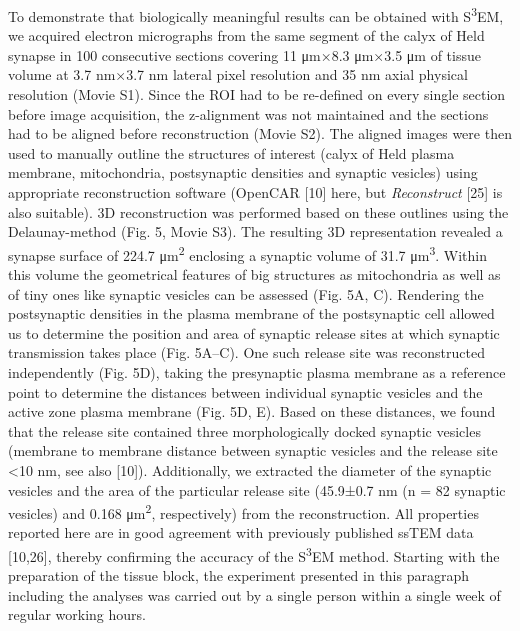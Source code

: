 \documentclass{article}
\begin{document}
To demonstrate that biologically meaningful results can be obtained with S\textsuperscript{3}EM, we acquired electron micrographs from the same segment of the calyx of Held synapse in 100 consecutive sections covering 11 μm×8.3 μm×3.5 μm of tissue volume at 3.7 nm×3.7 nm lateral pixel resolution and 35 nm axial physical resolution (Movie S1). Since the ROI had to be re-defined on every single section before image acquisition, the z-alignment was not maintained and the sections had to be aligned before reconstruction (Movie S2). The aligned images were then used to manually outline the structures of interest (calyx of Held plasma membrane, mitochondria, postsynaptic densities and synaptic vesicles) using appropriate reconstruction software (OpenCAR [10] here, but \emph{Reconstruct} [25] is also suitable). 3D reconstruction was performed based on these outlines using the Delaunay-method (Fig. 5, Movie S3). The resulting 3D representation revealed a synapse surface of 224.7 μm\textsuperscript{2} enclosing a synaptic volume of 31.7 μm\textsuperscript{3}. Within this volume the geometrical features of big structures as mitochondria as well as of tiny ones like synaptic vesicles can be assessed (Fig. 5A, C). Rendering the postsynaptic densities in the plasma membrane of the postsynaptic cell allowed us to determine the position and area of synaptic release sites at which synaptic transmission takes place (Fig. 5A–C). One such release site was reconstructed independently (Fig. 5D), taking the presynaptic plasma membrane as a reference point to determine the distances between individual synaptic vesicles and the active zone plasma membrane (Fig. 5D, E). Based on these distances, we found that the release site contained three morphologically docked synaptic vesicles (membrane to membrane distance between synaptic vesicles and the release site <10 nm, see also [10]). Additionally, we extracted the diameter of the synaptic vesicles and the area of the particular release site (45.9±0.7 nm (n = 82 synaptic vesicles) and 0.168 μm\textsuperscript{2}, respectively) from the reconstruction. All properties reported here are in good agreement with previously published ssTEM data [10,26], thereby confirming the accuracy of the S\textsuperscript{3}EM method. Starting with the preparation of the tissue block, the experiment presented in this paragraph including the analyses was carried out by a single person within a single week of regular working hours.

\end{document}
